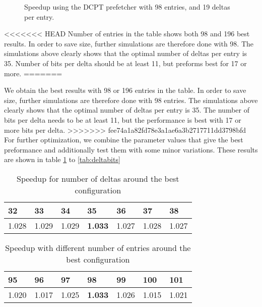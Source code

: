 \begin{figure}[h]
    \begin{centering}
        
        \caption{Speedup using the DCPT prefetcher with 98 entries, and 19 deltas per entry.}
        \label{figure:dcpt-delta-bits}
    \end{centering}
\end{figure}
<<<<<<< HEAD
Number of entries in the table shows both 98 and 196 best results. In order to save size, further simulations are therefore done with 98. The simulations above clearly shows that the optimal number of deltas per entry is 35. 
Number of bits per delta should be at least 11, but preforms best for 17 or more. 
=======

We obtain the best results with 98 or 196 entries in the table. In order to save size, further simulations are therefore done with 98 entries. The simulations above clearly shows that the optimal number of deltas per entry is 35. The number of bits per delta needs to be at least 11, but the performance is best with 17 or more bits per delta. 
>>>>>>> fee74a1a82fd78e3a1ae6a3b2717711dd3798bfd
For further optimization, we combine the parameter values that give the best preformance and additionally test them with some minor variations. These results are shown in table \ref{tab:numdelta} to \ref{tab:deltabits}


\begin{table}[h]
\centering
\label{tab:numdelta}
\begin{tabular}{|l|l|l|l|l|l|l|}
\hline
32    & 33    & 34    & \textbf{35}    & 36    & 37    & 38    \\ \hline
1.028 & 1.029 & 1.029 & \textbf{1.033} & 1.027 & 1.028 & 1.027 \\ \hline
\end{tabular}
\smallskip
\caption{Speedup for number of deltas around the best configuration}
\end{table}


\begin{table}[h]
\centering
\label{tab:tablesize}
\begin{tabular}{|l|l|l|l|l|l|l|}
\hline
95    & 96    & 97    & \textbf{98}    & 99    & 100   & 101   \\ \hline
1.020 & 1.017 & 1.025 & \textbf{1.033} & 1.026 & 1.015 & 1.021 \\ \hline
\end{tabular}
\smallskip
\caption{Speedup with different number of entries around the best configuration}
\end{table}


